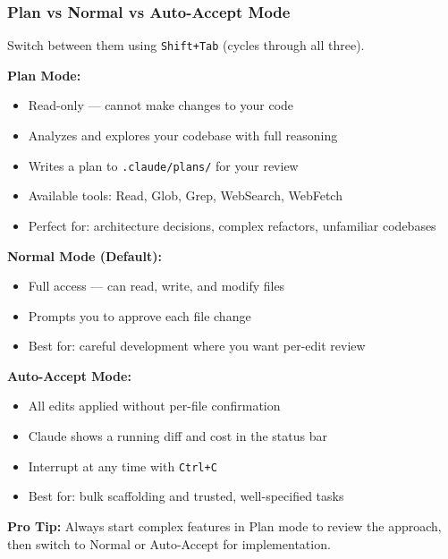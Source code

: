 \begin{frame}[fragile]\frametitle{Plan vs Normal vs Auto-Accept Mode}

Switch between them using \texttt{Shift+Tab} (cycles through all three).

\textbf{Plan Mode:}
  \begin{itemize}
    \item Read-only --- cannot make changes to your code
    \item Analyzes and explores your codebase with full reasoning
    \item Writes a plan to \texttt{.claude/plans/} for your review
    \item Available tools: Read, Glob, Grep, WebSearch, WebFetch
    \item Perfect for: architecture decisions, complex refactors, unfamiliar codebases
  \end{itemize}

\textbf{Normal Mode (Default):}
  \begin{itemize}
    \item Full access --- can read, write, and modify files
    \item Prompts you to approve each file change
    \item Best for: careful development where you want per-edit review
  \end{itemize}

\textbf{Auto-Accept Mode:}
  \begin{itemize}
    \item All edits applied without per-file confirmation
    \item Claude shows a running diff and cost in the status bar
    \item Interrupt at any time with \texttt{Ctrl+C}
    \item Best for: bulk scaffolding and trusted, well-specified tasks
  \end{itemize}

\textbf{Pro Tip:} Always start complex features in Plan mode to review the approach, then switch to Normal or Auto-Accept for implementation.
\end{frame}

